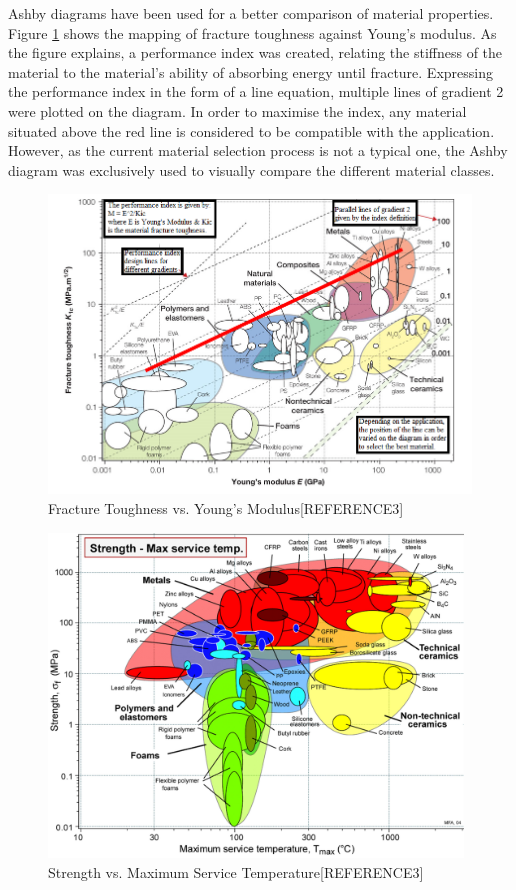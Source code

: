 \documentclass[12pt]{article}
\begin{document}
\noindent Ashby diagrams have been used for a better comparison of material properties. Figure \ref{young} shows the mapping of fracture toughness against Young’s modulus. As the figure explains, a performance index was created, relating the stiffness of the material to the material's ability of absorbing energy until fracture. Expressing the performance index in the form of a line equation, multiple lines of gradient 2 were plotted on the diagram. In order to maximise the index, any material situated above the red line is considered to be compatible with the application. However, as the current material selection process is not a typical one, the Ashby diagram was exclusively used to visually compare the different material classes. \\

\begin{figure}[hptb]
    \includegraphics[width=13cm]{KicModulusAshby}
    \caption{Fracture Toughness vs. Young's Modulus[REFERENCE3]}
    \label{young}
\end{figure}

\begin{figure}[hptb]
    \includegraphics[width=11cm]{AshbyStrengthMaxTem.jpg}
    \caption{Strength vs. Maximum Service Temperature[REFERENCE3]}
    \label{strength}
\end{figure}
\end{document}
